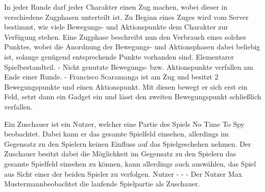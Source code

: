 {In jeder Runde darf jeder Charakter einen Zug machen, wobei dieser in verschiedene Zugphasen unterteilt ist. Zu Beginn eines Zuges wird vom Server bestimmt, wie viele Bewegungs- und Aktionspunkte dem Charakter zur Verfügung stehen. Eine Zugphase beschreibt nun den Verbrauch eines solches Punktes, wobei die Anordnung der Bewegungs- und Aktionsphasen dabei beliebig ist, solange genügend entsprechende Punkte vorhanden sind.}
{Elementarer Spielbestandteil.}
{-}
{Nicht genutzte Bewegungs- bzw. Aktionspunkte verfallen am Ende einer Runde.}
{-}
{Francisco Scaramanga ist am Zug und besitzt 2 Bewegungspunkte und einen Aktionspunkt. Mit diesen bewegt er sich erst ein Feld, setzt dann ein Gadget ein und lässt den zweiten Bewegungspunkt schließlich verfallen.}

{Ein Zuschauer ist ein Nutzer, welcher eine Partie des Spiels \glqq{}No Time To Spy\grqq{} beobachtet. Dabei kann er das gesamte Spielfeld einsehen, allerdings im Gegensatz zu den Spielern keinen Einfluss auf das Spielgeschehen nehmen. Der Zuschauer besitzt dabei die Möglichkeit im Gegensatz zu den Spielern das gesamte Spielfeld einsehen zu können, kann allerdings auch auswählen, das Spiel aus Sicht einer der beiden Spieler zu verfolgen.}
{Nutzer}
{-}
{-}
{-}
{Der Nutzer \glqq Max Mustermann\grqq beobachtet die laufende Spielpartie als Zuschauer.}

